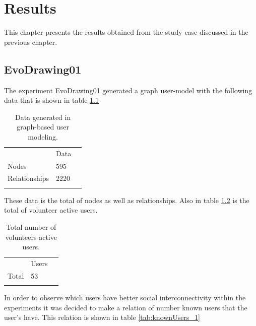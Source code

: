 \chapter{Results} \label{sec:6} This chapter presents the results obtained from
the study case discussed in the previous chapter.

\section{EvoDrawing01}

The experiment EvoDrawing01 generated a graph user-model with the following data
that is shown in table \ref{tab:dataGenerated_1}

\begin{table}
\small
\caption{Data generated in graph-based user modeling.}
\label{tab:dataGenerated_1}
\centering
\small
\begin{tabular}{p{3cm} p{3cm} p{3cm} }
\hline\noalign{\smallskip}
  & Data &  \\
\noalign{\smallskip}\hline\noalign{\smallskip}
\small{Nodes} & \small{595} & \\ \hline
\small{Relationships} & \small{2220} & \\ \hline

\noalign{\smallskip}\hline
\end{tabular}
\end{table}


These data is the total of nodes as well as relationships. Also in
table \ref{tab:totalUsers_12} is the total of volunteer active users.

\begin{table}
\small
\caption{Total number of volunteers active users.}
\label{tab:totalUsers_12}
\centering
\small
\begin{tabular}{p{3cm} p{3cm} p{3cm} }
\hline\noalign{\smallskip}
  & Users &  \\
\noalign{\smallskip}\hline\noalign{\smallskip}
\small{Total } & \small{53} & \\ \hline
\noalign{\smallskip}\hline
\end{tabular}
\end{table}

In order to observe which users have better social interconnectivity within the
experiments it was decided to make a relation of number known users that the
user’s have. This relation is shown in table \ref{tab:knownUsers_1}

